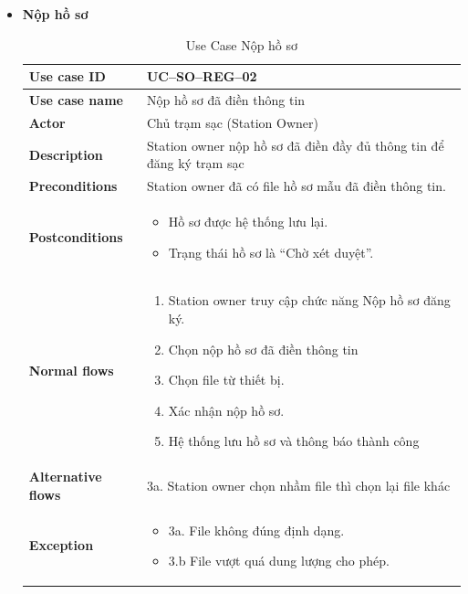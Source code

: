 \begin{enumerate}[label=\textbf{\alph*)}]
\begin{itemize}
\begin{longtable}{|m{}|m{}|}
      \hline
      \textbf{Exception} &
      2a. Hồ sơ mẫu không tồn tại.\\
      \hline
      \end{longtable}
  \item \textbf{Nộp hồ sơ }
    \begin{center}
      \renewcommand{\arraystretch}{1.5}
      \begin{longtable}{|m{}|m{}|}
          \caption{Use Case Nộp hồ sơ}
        \label{tab:uc_so_reg_02} \\
        \hline
        \textbf{Use case ID} & UC--SO--REG--02 \\
        \hline
        \textbf{Use case name} & Nộp hồ sơ đã điền thông tin \\
        \hline
        \textbf{Actor} & Chủ trạm sạc (Station Owner) \\
        \hline
        \textbf{Description} & Station owner nộp hồ sơ đã điền đầy đủ thông tin để đăng ký trạm sạc \\
        \hline
        \textbf{Preconditions} &
        Station owner đã có file hồ sơ mẫu đã điền thông tin.\\
        \hline
        \textbf{Postconditions} &
        \begin{itemize}
          \item Hồ sơ được hệ thống lưu lại.
          \item Trạng thái hồ sơ là “Chờ xét duyệt”.
        \end{itemize}\\
        \hline
        \textbf{Normal flows} &
        \begin{enumerate}[label=\arabic*.]
          \item Station owner truy cập chức năng Nộp hồ sơ đăng ký.
          \item Chọn nộp hồ sơ đã điền thông tin
          \item Chọn file từ thiết bị.
          \item Xác nhận nộp hồ sơ.
          \item Hệ thống lưu hồ sơ và thông báo thành công
        \end{enumerate}\\
        \hline
        \textbf{Alternative flows} &
        3a. Station owner chọn nhầm file thì chọn lại file khác\\
        \hline
        \textbf{Exception} &
        \begin{itemize}
          \item 3a. File không đúng định dạng.
          \item 3.b File vượt quá dung lượng cho phép.
        \end{itemize}\\
        \hline
        \end{longtable}
    \end{center}
\end{itemize}


\end{enumerate}
